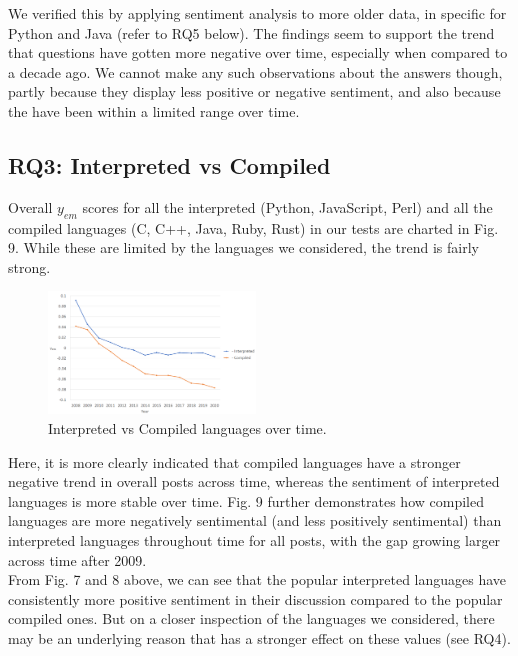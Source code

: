 \documentclass[conference]{IEEEtran}
\begin{document}
We verified this by applying sentiment analysis to more older data, in specific for Python and Java (refer to RQ5 below). The findings seem to support the trend that questions have gotten more negative over time, especially when compared to a decade ago. We cannot make any such observations about the answers though, partly because they display less positive or negative sentiment, and also because the have been within a limited range over time.\\


\subsection{RQ3: Interpreted vs Compiled}
Overall $y_{em}$ scores for all the interpreted (Python, JavaScript, Perl) and all the compiled languages (C, C++, Java, Ruby, Rust) in our tests are charted in Fig. 9. While these are limited by the languages we considered, the trend is fairly strong. \\

\begin{figure}[htbp]
\centerline{\includegraphics[width=0.49\textwidth]{figures/time_interpreted_compiled.png}}
\caption{Interpreted vs Compiled languages over time.}
\label{fig}
\end{figure}

Here, it is more clearly indicated that compiled languages have a stronger negative trend in overall posts across time, whereas the sentiment of interpreted languages is more stable over time. Fig. 9 further demonstrates how compiled languages are more negatively sentimental (and less positively sentimental) than interpreted languages throughout time for all posts, with the gap growing larger across time after 2009. \\

From Fig. 7 and 8 above, we can see that the popular interpreted languages have consistently more positive sentiment in their discussion compared to the popular compiled ones. But on a closer inspection of the languages we considered, there may be an underlying reason that has a stronger effect on these values (see RQ4). \\
\end{document}
